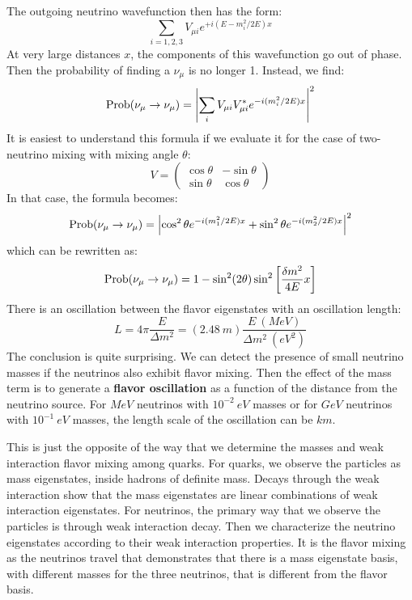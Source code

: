 \documentclass[../../main/main.tex]{subfiles}
\begin{document}
The outgoing neutrino wavefunction then has the form:
\begin{equation}
	\sum_{i=1,2,3} V_{\mu i} e^{+i (E - m^2_i/2E)x}
	\label{eq:}
\end{equation}
At very large distances \( x \), the components of this wavefunction go out of phase. Then the probability of finding a \( \nu_{\mu} \) is no longer 1. Instead, we find:
\begin{equation}
	\text{Prob}(\nu_{\mu} \rightarrow \nu_{\mu})
	=
	\abs{\sum_{i} V_{\mu i} V^*_{\mu i} e^{-i (m^2_i / 2E)x}}^2
	\label{eq:}
\end{equation}
It is easiest to understand this formula if we evaluate it for the case of two-neutrino mixing with mixing angle \( \theta \):
\begin{equation}
	V
	=
	\begin{pmatrix}
		\cos\theta & -\sin\theta \\
		\sin\theta &  \cos\theta
	\end{pmatrix}
	\label{eq:}
\end{equation}
In that case, the formula becomes:
\begin{equation}
	\text{Prob}(\nu_{\mu} \rightarrow \nu_{\mu})
	=
	\abs{ \cos^2\theta e^{-i (m^2_1 / 2E)x} + \sin^2\theta e^{-i (m^2_2 / 2E)x} }^2
	\label{eq:}
\end{equation}
which can be rewritten as:
\begin{equation}
	\text{Prob}(\nu_{\mu} \rightarrow \nu_{\mu})
	=
	1 - \sin^2(2\theta) \sin^2 \qty[\frac{\delta m^2}{4E} x]
	\label{eq:}
\end{equation}
There is an oscillation between the flavor eigenstates with an oscillation length:
\begin{equation}
	L
	=
	4\pi \frac{E}{\Delta m^2}
	=
	(2.48 \ \si{m}) \frac{E \ (\si{MeV})}{\Delta m^2 \ (\si{eV}^2)}
	\label{eq:}
\end{equation}
The conclusion is quite surprising. We can detect the presence of small neutrino masses if the neutrinos also exhibit flavor mixing. Then the effect of the mass term is to generate a \textbf{flavor oscillation} as a function of the distance from the neutrino source. For \( \si{MeV} \) neutrinos with \( 10^{-2} \ \si{eV} \) masses or for \( \si{GeV} \) neutrinos with \( 10^{-1} \ \si{eV} \) masses, the length scale of the oscillation can be \( \si{km} \).

This is just the opposite of the way that we determine the masses and weak interaction flavor mixing among quarks. For quarks, we observe the particles as mass eigenstates, inside hadrons of definite mass. Decays through the weak interaction show that the mass eigenstates are linear combinations of weak interaction eigenstates.
For neutrinos, the primary way that we observe the particles is through weak interaction decay. Then we characterize the neutrino eigenstates according to their weak interaction properties. It is the flavor mixing as the neutrinos travel that demonstrates that there is a mass eigenstate basis, with different masses for the three neutrinos, that is different from the flavor basis.
\end{document}
